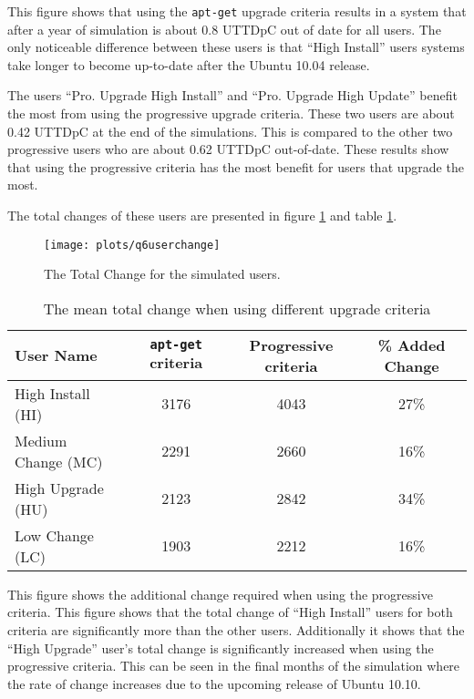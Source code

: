 This figure shows that using the \texttt{apt-get} upgrade criteria results in a system that after a year of simulation is about 0.8 UTTDpC out of date for all users. 
The only noticeable difference between these users is that ``High Install'' users systems take longer to become up-to-date after the Ubuntu 10.04 release.


The users ``Pro. Upgrade High Install'' and ``Pro. Upgrade High Update'' benefit the most from using the progressive upgrade criteria.
These two users are about 0.42 UTTDpC at the end of the simulations.
This is compared to the other two progressive users who are about 0.62 UTTDpC out-of-date.
These results show that using the progressive criteria has the most benefit for users that upgrade the most.      

The total changes of these users are presented in figure \ref{exp.q6userchange} and table \ref{exp.tblq6change}.
\begin{figure}[htp]
\begin{center}
  \texttt{[image: plots/q6userchange]}
  \caption{The Total Change for the simulated users.}
  \label{exp.q6userchange}
\end{center}
\end{figure}

\begin{table}[h!]
\centering
\begin{tabular}{|l | c | c | c | }
\hline
User Name 				& \texttt{apt-get} criteria 		& Progressive criteria 	& \% Added Change	\\ \hline
High Install (HI)			& 3176			& 4043 	& 27\% 	\\
Medium Change (MC)			& 2291			& 2660 	& 16\% 	\\
High Upgrade (HU)			& 2123			& 2842	& 34\%   \\
Low Change 	(LC)			& 1903			& 2212 	& 16\%   \\ \hline
\end{tabular}
\caption{The mean total change when using different upgrade criteria}
\label{exp.tblq6change}
\end{table}

This figure shows the additional change required when using the progressive criteria.
This figure shows that the total change of  ``High Install'' users for both criteria are significantly more than the other users.
Additionally it shows that the ``High Upgrade'' user's total change is significantly increased when using the progressive criteria.
This can be seen in the final months of the simulation where the rate of change increases due to the upcoming release of Ubuntu 10.10.

